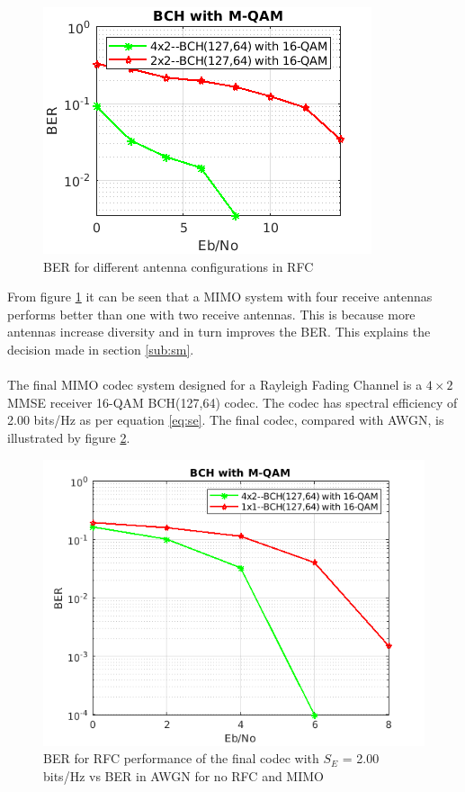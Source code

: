 \documentclass[11pt]{report}
\begin{document}
\begin{figure}[h!]
	\centering
	\includegraphics[scale=1]{resources/twotwoV2.png}
	\caption{BER for different antenna configurations in RFC}
	\label{fig:anten}
\end{figure}
From  figure \ref{fig:anten} it can be seen that a MIMO system with four receive antennas performs better than one with two receive antennas. This is because more antennas increase diversity and in turn improves the BER. This explains the decision made in section \ref{sub:sm}.
\\
\\
The final MIMO codec system designed for a Rayleigh Fading Channel is a $4\times 2$ MMSE receiver 16-QAM BCH(127,64) codec. The codec has spectral efficiency of 2.00 bits/Hz as per equation \ref{eq:se}. The final codec, compared with AWGN, is illustrated by figure \ref{fig:final}.

\begin{figure}[h!]
	\centering
	\includegraphics[scale=1]{resources/fourtwoV1.png}
	\caption{BER for RFC performance of the final codec with $S_E$ = 2.00 bits/Hz vs BER in AWGN for no RFC and MIMO}
	\label{fig:final}
\end{figure}
\end{document}
